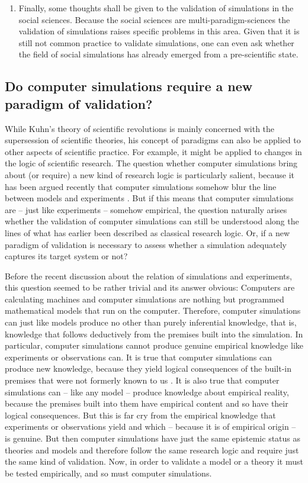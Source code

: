 \documentclass[12pt, a4paper]{article}
\begin{document}
\begin{enumerate}
  \item Finally, some thoughts shall be given to the validation of
    simulations in the social sciences. Because the social sciences
    are multi-paradigm-sciences the validation of simulations raises
    specific problems in this area. Given that it is still not common
    practice to validate simulations, one can even ask whether the
    field of social simulations has already emerged from a
    pre-scientific state.

\end{enumerate}


\subsection{Do computer simulations require a new paradigm of
validation?}

While Kuhn's theory of scientific revolutions is mainly concerned with
the supersession of scientific theories, his concept of paradigms can
also be applied to other aspects of scientific practice. For example,
it might be applied to changes in the logic of scientific research.
The question whether computer simulations bring about (or require) a
new kind of research logic is particularly salient, because it has
been argued recently that computer simulations somehow blur the line
between models and experiments \citep{winsberg:2009}. But if this
means that computer simulations are -- just like experiments --
somehow empirical, the question naturally arises whether the
validation of computer simulations can still be understood along the
lines of what has earlier been described as classical research logic.
Or, if a new paradigm of validation is necessary to assess whether a
simulation adequately captures its target system or not?

Before the recent discussion about the relation of simulations and
experiments, this question seemed to be rather trivial and its answer
obvious: Computers are calculating machines and computer simulations
are nothing but programmed mathematical models that run on the
computer. Therefore, computer simulations can just like models produce
no other than purely inferential knowledge, that is, knowledge that
follows deductively from the premises built into the simulation. In
particular, computer simulations cannot produce genuine empirical
knowledge like experiments or observations can. It is true that
computer simulations can produce new knowledge, because they yield
logical consequences of the built-in premises that were not formerly
known to us \citep[sec. 1.3.4]{imbert:2017}. It is also true that
computer simulations can -- like any model -- produce knowledge about
empirical reality, because the premises built into them have empirical
content and so have their logical consequences. But this is far cry
from the empirical knowledge that experiments or observations yield
and which -- because it is of empirical origin -- is genuine. But then
computer simulations have just the same epistemic status as theories
and models and therefore follow the same research logic and require
just the same kind of validation. Now, in order to validate a model or
a theory it must be tested empirically, and so must computer
simulations.
\end{document}
